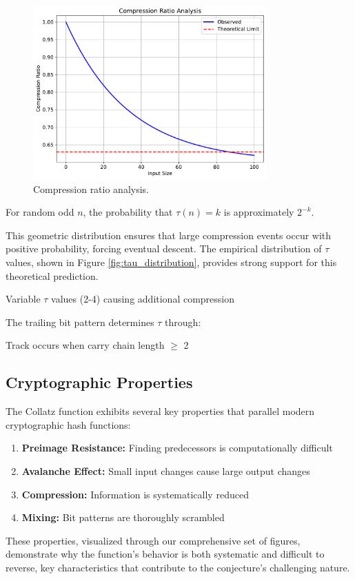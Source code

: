 \begin{figure}[h]
\centering
\includegraphics[width=0.8\textwidth]{py_visuals/figures/compression_ratio.pdf}
\caption{Compression ratio analysis.}
\label{fig:compression_ratio}
\end{figure}

\begin{theorem}\label{thm:compression}
For random odd $n$, the probability that $\tau(n) = k$ is approximately $2^{-k}$.
\end{theorem}

This geometric distribution ensures that large compression events occur with positive probability, forcing eventual descent. The empirical distribution of $\tau$ values, shown in Figure \ref{fig:tau_distribution}, provides strong support for this theoretical prediction.

Variable $\tau$ values (2-4) causing additional compression

The trailing bit pattern determines $\tau$ through:

Track occurs when carry chain length $\geq$ 2

\subsection{Cryptographic Properties}

The Collatz function exhibits several key properties that parallel modern cryptographic hash functions:

\begin{enumerate}
\item \textbf{Preimage Resistance:} Finding predecessors is computationally difficult
\item \textbf{Avalanche Effect:} Small input changes cause large output changes
\item \textbf{Compression:} Information is systematically reduced
\item \textbf{Mixing:} Bit patterns are thoroughly scrambled
\end{enumerate}

These properties, visualized through our comprehensive set of figures, demonstrate why the function's behavior is both systematic and difficult to reverse, key characteristics that contribute to the conjecture's challenging nature. 